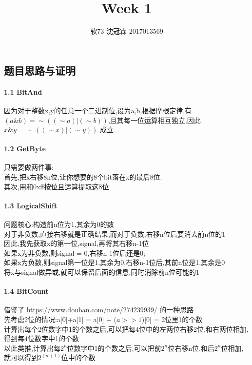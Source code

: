 \documentclass{article}
\title{Week 1}
\author{软73 沈冠霖 2017013569}
\begin{document}
\begin{CJK}{UTF8}{gkai}
\maketitle

\section{题目思路与证明}
\paragraph{1.1 BitAnd} 
因为对于整数x,y的任意一个二进制位,设为a,b,根据摩根定律,有$(a \& b) = \sim ((\sim a) | (\sim b))$,且其每一位运算相互独立,因此 $x\&y = \sim((\sim x)|(\sim y))$ 成立\\
\paragraph{1.2 GetByte} 
只需要做两件事:\\
首先,把x右移8n位,让你想要的8个bit落在x的最后8位.\\
其次,用和0xff按位且运算提取这8位\\
\paragraph{1.3 LogicalShift} 
问题核心:构造前n位为1,其余为0的数\\
对于非负数,直接右移就是正确结果,而对于负数,右移n位后要消去前n位的1\\
因此,我先获取x的第一位,signal,再将其右移n-1位\\
如果x为非负数,则signal = 0,右移n-1位后还是0;\\
如果x为负数,则signal第一位是1,其余为0,右移n-1位后,其前n位是1,其余是0\\
将x与signal做异或,就可以保留后面的信息,同时消除前n位可能的1\\

\paragraph{1.4 BitCount} 
借鉴了 https://www.douban.com/note/274239939/ 的一种思路 \\
先考虑2位的情况:a[0]+a[1] = a[0] + ($a>>1$)[0] =  2位里1的个数\\
计算出每个2位数字中1的个数之后,可以把每4位中的左两位右移2位,和右两位相加,得到每4位数字中1的个数\\
以此类推,计算出每$2^{n}$位数字中1的个数之后,可以把前$2^{n}$位右移n位,和后$2^{n}$位相加,就可以得到$2^{(n+1)}$位中的个数\\


\end{CJK}
\end{document}
